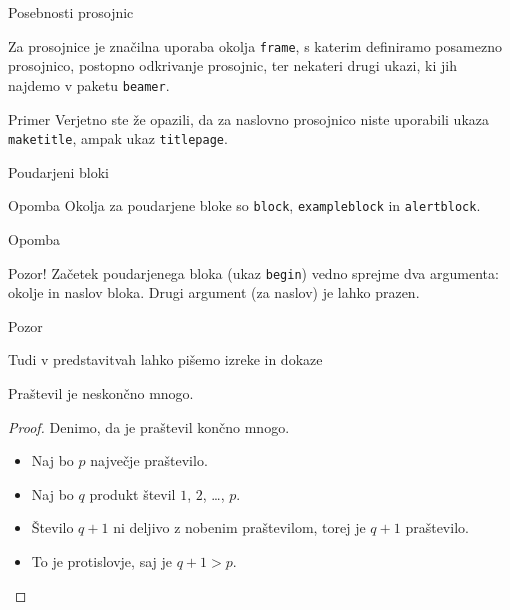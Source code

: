 \begin{frame}{Posebnosti prosojnic}

	Za prosojnice je značilna uporaba okolja \texttt{frame},
	s katerim definiramo posamezno prosojnico,
	postopno odkrivanje prosojnic,
	ter nekateri drugi ukazi, ki jih najdemo v paketu \texttt{beamer}. \pause[4]
	\begin{exampleblock}{Primer}
		Verjetno ste že opazili, da za naslovno prosojnico niste uporabili
		ukaza \texttt{maketitle}, ampak ukaz \texttt{titlepage}.
	\end{exampleblock}
\end{frame}

\begin{frame}{Poudarjeni bloki}
		\begin{block}{Opomba}
		Okolja za poudarjene bloke so \texttt{block}, \texttt{exampleblock} in \texttt{alertblock}.
		\end{block}{Opomba}
		\begin{alertblock}{Pozor!}
		Začetek poudarjenega bloka (ukaz \texttt{begin}) vedno sprejme 
		dva argumenta: okolje in naslov bloka.
		Drugi argument (za naslov) je lahko prazen. 
		\end{alertblock}{Pozor}

\end{frame}

\begin{frame}{Tudi v predstavitvah lahko pišemo izreke in dokaze}

	\begin{izrek}
	   Praštevil je neskončno mnogo.
	\end{izrek}
	\begin{proof}
	   Denimo, da je praštevil končno mnogo.
	   \begin{itemize}[<+->]
		  \item Naj bo \(p\) \alert<4>{največje} praštevilo.
		  \item Naj bo \(q\) produkt števil \(1\), \(2\), \ldots, \(p\). 
		  \item Število \(q+1\) ni deljivo z nobenim praštevilom, torej je \(q+1\) praštevilo.
		  \item To je protislovje, saj je \(q+1>p\). \qedhere
	   \end{itemize}
	\end{proof}
 \end{frame}
 
